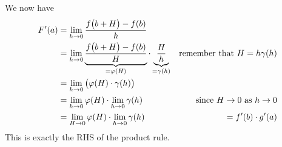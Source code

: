 We now have
\begin{align*}
  F'(a)
  &= \lim_{h \to 0} \frac{f\big(b + H\big)-f(b)}{h} \\
  &= \lim_{h \to 0}
    \underbrace{\frac{f\big(b + H\big)-f(b)}{H}}_{= \varphi(H) } \cdot
    \underbrace{\frac{H}{h}}_{ = \gamma(h)}
& \text{remember that $H= h \gamma(h)$} \\
  &= \lim_{h \to 0}\big( \varphi(H) \cdot \gamma(h) \big) \\
  &= \lim_{h \to 0} \varphi(H) \cdot \lim_{h \to 0} \gamma(h)  & \text{since $H\to0$
as $h\to 0$}\\
  &= \lim_{H \to 0} \varphi(H) \cdot \lim_{h \to 0} \gamma(h)
  &= f'(b) \cdot g'(a)
\end{align*}
This is exactly the RHS of the product rule.

%
